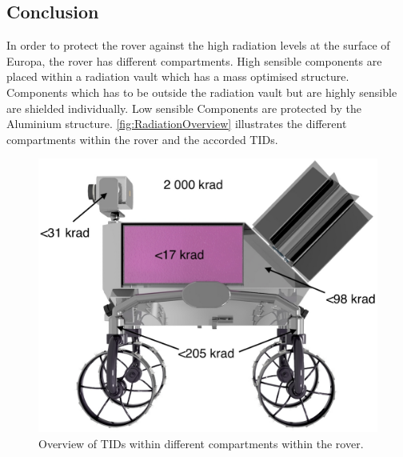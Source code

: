 \subsection{Conclusion}

\label{subsec:RadiationConclusion}

In order to protect the rover against the high radiation levels at the surface of Europa, the rover has different compartments. High sensible components are placed within a radiation vault which has a mass optimised structure. Components which has to be outside the radiation vault but are highly sensible are shielded individually. Low sensible Components are protected by the Aluminium structure. \autoref{fig:RadiationOverview} illustrates the different compartments within the rover and the accorded TIDs.

\begin{figure}[htb]
     \centering
     \includegraphics[width=\textwidth]{Media/INSPIRE_Radiation}
     \caption{Overview of TIDs within different compartments within the rover.}
     \label{fig:RadiationOverview}
\end{figure}

\clearpage
